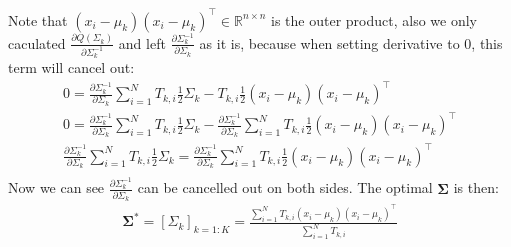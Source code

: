 \documentclass{article} [10pt] %
\newcommand{\bs}{\boldsymbol}
\begin{document}
Note that $(x_i-\mu_k)(x_i-\mu_k)^\top\in\mathbb{R}^{n\times n}$ is the outer product, also we only caculated $\frac{\partial Q(\Sigma_k)}{\partial\Sigma_k^{-1}}$ and left $\frac{\partial\Sigma_k^{-1}}{\partial\Sigma_k}$ as it is, because when setting derivative to 0, this term will cancel out:
\begin{align}
0=\frac{\partial\Sigma_k^{-1}}{\partial\Sigma_k} \sum_{i=1}^N T_{k, i}\frac{1}{2}\Sigma_k -  T_{k, i}\frac{1}{2}(x_i-\mu_k)(x_i-\mu_k)^\top\\
0=\frac{\partial\Sigma_k^{-1}}{\partial\Sigma_k} \sum_{i=1}^N T_{k, i}\frac{1}{2}\Sigma_k - \frac{\partial\Sigma_k^{-1}}{\partial\Sigma_k} \sum_{i=1}^N T_{k, i}\frac{1}{2}(x_i-\mu_k)(x_i-\mu_k)^\top\\
\frac{\partial\Sigma_k^{-1}}{\partial\Sigma_k} \sum_{i=1}^N T_{k, i}\frac{1}{2}\Sigma_k=  \frac{\partial\Sigma_k^{-1}}{\partial\Sigma_k} \sum_{i=1}^N T_{k, i}\frac{1}{2}(x_i-\mu_k)(x_i-\mu_k)^\top\\
\end{align}
Now we can see $\frac{\partial\Sigma_k^{-1}}{\partial\Sigma_k}$ can be cancelled out on both sides. The optimal $\bs\Sigma$ is then:
\begin{align}
\boxed{
	\bs\Sigma^*=[\Sigma_k]_{k=1:K}=\frac{\sum_{i=1}^N T_{k, i}(x_i-\mu_k)(x_i-\mu_k)^\top}{ \sum_{i=1}^N T_{k, i}}
}
\end{align}
\end{document}
